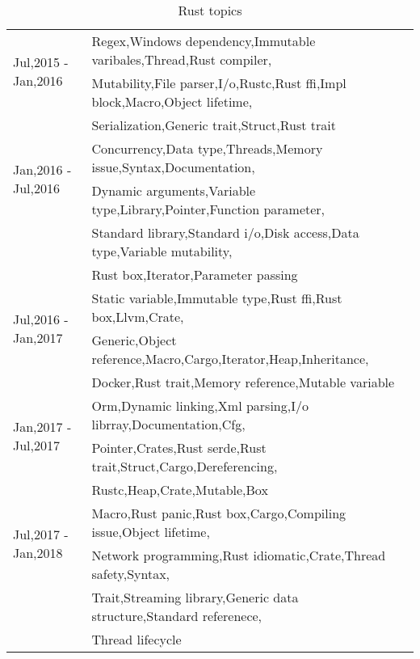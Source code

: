 \begin{table}[]
\begin{tabular}{|l|l|}
\multirow{2}{*}{Jul,2015 - Jan,2016} & Regex,Windows dependency,Immutable varibales,Thread,Rust compiler,\\ & Mutability,File parser,I/o,Rustc,Rust ffi,Impl block,Macro,Object lifetime,\\ & Serialization,Generic trait,Struct,Rust trait\\ \hline
\multirow{2}{*}{Jan,2016 - Jul,2016} & Concurrency,Data type,Threads,Memory issue,Syntax,Documentation,\\ & Dynamic arguments,Variable type,Library,Pointer,Function parameter,\\ & Standard library,Standard i/o,Disk access,Data type,Variable mutability,\\ & Rust box,Iterator,Parameter passing\\ \hline
\multirow{2}{*}{Jul,2016 - Jan,2017} & Static variable,Immutable type,Rust ffi,Rust box,Llvm,Crate,\\ & Generic,Object reference,Macro,Cargo,Iterator,Heap,Inheritance,\\ & Docker,Rust trait,Memory reference,Mutable variable\\ \hline
\multirow{2}{*}{Jan,2017 - Jul,2017} & Orm,Dynamic linking,Xml parsing,I/o librray,Documentation,Cfg,\\ & Pointer,Crates,Rust serde,Rust trait,Struct,Cargo,Dereferencing,\\ & Rustc,Heap,Crate,Mutable,Box\\ \hline
\multirow{2}{*}{Jul,2017 - Jan,2018} & Macro,Rust panic,Rust box,Cargo,Compiling issue,Object lifetime,\\ & Network programming,Rust idiomatic,Crate,Thread safety,Syntax,\\ & Trait,Streaming library,Generic data structure,Standard referenece,\\ & Thread lifecycle\\ \hline

\end{tabular}
\caption{Rust topics}
\label{table:Rust topics}
\end{table}